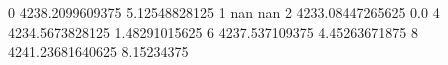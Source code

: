 0 4238.2099609375 5.12548828125
1 nan nan
2 4233.08447265625 0.0
4 4234.5673828125 1.48291015625
6 4237.537109375 4.45263671875
8 4241.23681640625 8.15234375
